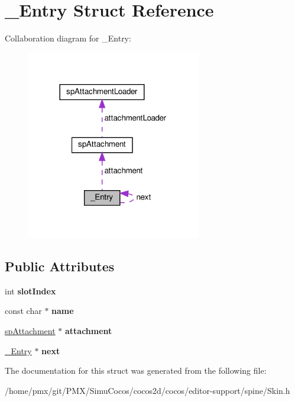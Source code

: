 \hypertarget{struct__Entry}{}\section{\+\_\+\+Entry Struct Reference}
\label{struct__Entry}


Collaboration diagram for \+\_\+\+Entry\+:
\nopagebreak
\begin{figure}[H]
\begin{center}
\leavevmode
\includegraphics[width=216pt]{struct__Entry__coll__graph}
\end{center}
\end{figure}
\subsection*{Public Attributes}
\begin{DoxyCompactItemize}
\item 
\mbox{\label{struct__Entry_a5de17f95ef6aaffd2566b7e22f0942bb}} 
int {\bfseries slot\+Index}
\item 
\mbox{\label{struct__Entry_a636552ae4479565e60a8db9d2bb17fc9}} 
const char $\ast$ {\bfseries name}
\item 
\mbox{\label{struct__Entry_a1937be9c2993c803737ef28f2a24ab41}} 
\hyperlink{structspAttachment}{sp\+Attachment} $\ast$ {\bfseries attachment}
\item 
\mbox{\label{struct__Entry_aaf74558c9ebab1af0591a1b495e4fa9a}} 
\hyperlink{struct__Entry}{\+\_\+\+Entry} $\ast$ {\bfseries next}
\end{DoxyCompactItemize}


The documentation for this struct was generated from the following file\+:\begin{DoxyCompactItemize}
\item 
/home/pmx/git/\+P\+M\+X/\+Simu\+Cocos/cocos2d/cocos/editor-\/support/spine/Skin.\+h\end{DoxyCompactItemize}
